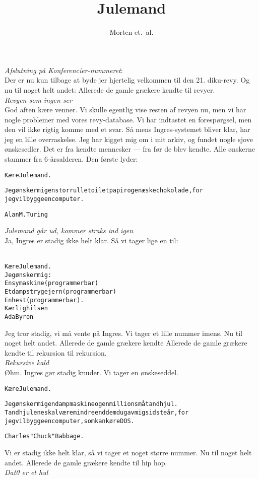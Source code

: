 \documentclass[a4paper,11pt]{article}
\title{Julemand}
\author{Morten et.\ al.}
\begin{document}
\maketitle

\noindent 
{\em Afslutning p\aa{} {\em Konferencier}-nummeret}: \\ 
Der er nu kun tilbage at byde jer hjertelig velkommen til den 21.
{\sc diku}-revy.  Og nu til noget helt andet: Allerede de gamle
gr\ae{}kere kendte til revyer. \\
{\em Revyen som ingen ser}\\ 
God aften k\ae{}re venner. Vi skulle egentlig vise resten af revyen nu,
men vi har nogle problemer med vores revy-database. Vi har indtastet
en foresp\o{}rgsel, men den vil ikke rigtig komme med et svar. S\aa{} mens
Ingres-systemet bliver klar, har jeg en lille overraskelse. Jeg har
kigget mig om i mit arkiv, og fundet nogle sjove \o{}nskesedler. Det er
fra kendte mennesker --- fra f\o{}r de blev kendte. Alle \o{}nskerne
stammer fra 6-\aa{}rsalderen. Den f\o{}rste lyder: 

\begin{alltt}
{\rm 
K\ae{}re Julemand.

Jeg \o{}nsker mig en stor rulle toiletpapir og en \ae{}ske chokolade, for
jeg vil bygge en computer.

                                 Alan M. Turing
}
\end{alltt}
{\em Julemand g\aa{}r ud, kommer straks ind igen}\\
Ja, Ingres er stadig ikke helt klar. S\aa{} vi tager lige en til:
\begin{alltt}
{\rm
K\ae{}re Julemand.
Jeg \o{}nsker mig:
                   En symaskine (programmerbar)
                   Et dampstrygejern (programmerbar)
                   En hest (programmerbar).
                            K\ae{}rlig hilsen
                            Ada Byron
}
\end{alltt}
Jeg tror stadig, vi m\aa{} vente p\aa{} Ingres. Vi tager et lille
nummer imens. Nu til noget helt andet. Allerede de gamle gr\ae{}kere
kendte Allerede de gamle gr\ae{}kere kendte til rekursion til
rekursion. \\
{\em Rekursive kald} \\
\O{}hm. Ingres g\o{}r stadig knuder. Vi tager en \o{}nskeseddel.
\begin{alltt}
{\rm
K\ae{}re Julemand.

Jeg \o{}nsker mig en dampmaskine og en million sm\aa{} tandhjul.
Tandhjulene skal v\ae{}re mindre end dem du gav mig sidste \aa{}r, for
jeg vil bygge en computer, som kan k\o{}re DOS.

                                 Charles "Chuck" Babbage.
}
\end{alltt}
Vi er stadig ikke helt klar, s\aa{} vi tager et noget st\o{}rre nummer.
Nu til noget helt andet. Allerede de gamle gr\ae{}kere kendte til hip hop. \\
{\em Dat0 er et hul} \\
\end{document}
